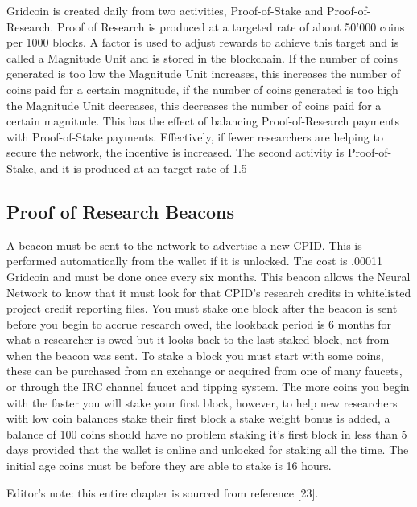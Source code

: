 Gridcoin is created daily from two activities, Proof-of-Stake and Proof-of-Research. Proof of Research is produced at a targeted rate of about 50'000 coins per 1000 blocks. A factor is used to adjust rewards to achieve this target and is called a Magnitude Unit and is stored in the blockchain. If the number of coins generated is too low the Magnitude Unit increases, this increases the number of coins paid for a certain magnitude, if the number of coins generated is too high the Magnitude Unit decreases, this decreases the number of coins paid for a certain magnitude. This has the effect of balancing Proof-of-Research payments with Proof-of-Stake payments. Effectively, if fewer researchers are helping to secure the network, the incentive is increased. The second activity is Proof-of-Stake, and it is produced at an target rate of 1.5%

\subsection{Proof of Research Beacons}

A beacon must be sent to the network to advertise a new CPID. This is performed automatically from the wallet if it is unlocked. The cost is .00011 Gridcoin and must be done once every six months. This beacon allows the Neural Network to know that it must look for that CPID's research credits in whitelisted project credit reporting files. You must stake one block after the beacon is sent before you begin to accrue research owed, the lookback period is 6 months for what a researcher is owed but it looks back to the last staked block, not from when the beacon was sent. To stake a block you must start with some coins, these can be purchased from an exchange or acquired from one of many faucets, or through the IRC channel faucet and tipping system. The more coins you begin with the faster you will stake your first block, however, to help new researchers with low coin balances stake their first block a stake weight bonus is added, a balance of 100 coins should have no problem staking it's first block in less than 5 days provided that the wallet is online and unlocked for staking all the time. The initial age coins must be before they are able to stake is 16 hours.

Editor's note: this entire chapter is sourced from reference [23].\\
